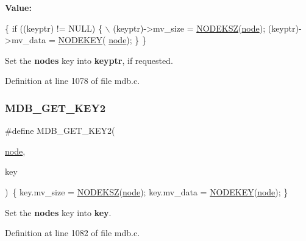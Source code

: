 {\bfseries Value\+:}
\begin{DoxyCode}
\{ \textcolor{keywordflow}{if} ((keyptr) != NULL) \{ \(\backslash\)
    (keyptr)->mv\_size = \mbox{\hyperlink{group__internal_gaa680cb94fd0c91a8818205fcef2d1b53}{NODEKSZ}}(\mbox{\hyperlink{structnode}{node}}); (keyptr)->mv\_data = \mbox{\hyperlink{group__internal_ga0c2d3ecf490b76fd5ef32aa4082edefe}{NODEKEY}}(
      \mbox{\hyperlink{structnode}{node}}); \} \}
\end{DoxyCode}
Set the {\bfseries node\textquotesingle{}s} key into {\bfseries keyptr}, if requested. 

Definition at line 1078 of file mdb.\+c.

\mbox{\label{group__internal_gaeda61f782c32f78026d0513425308242}} 
\subsubsection{\texorpdfstring{M\+D\+B\+\_\+\+G\+E\+T\+\_\+\+K\+E\+Y2}{MDB\_GET\_KEY2}}
{\footnotesize\ttfamily \#define M\+D\+B\+\_\+\+G\+E\+T\+\_\+\+K\+E\+Y2(\begin{DoxyParamCaption}\item[{}]{\mbox{\hyperlink{structnode}{node}},  }\item[{}]{key }\end{DoxyParamCaption})~\{ key.\+mv\+\_\+size = \mbox{\hyperlink{group__internal_gaa680cb94fd0c91a8818205fcef2d1b53}{N\+O\+D\+E\+K\+SZ}}(\mbox{\hyperlink{structnode}{node}}); key.\+mv\+\_\+data = \mbox{\hyperlink{group__internal_ga0c2d3ecf490b76fd5ef32aa4082edefe}{N\+O\+D\+E\+K\+EY}}(\mbox{\hyperlink{structnode}{node}}); \}}

Set the {\bfseries node\textquotesingle{}s} key into {\bfseries key}. 

Definition at line 1082 of file mdb.\+c.

\mbox{\label{group__internal_ga1d56e55199f31cd585300a2b73c22d82}} 

